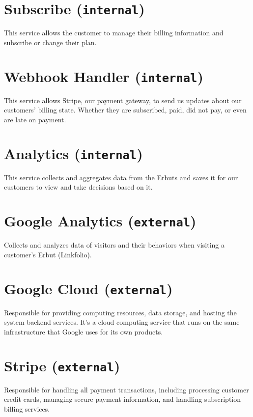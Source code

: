 \documentclass[a4paper]{report}
\begin{document}
\section{Subscribe (\texttt{internal})}

This service allows the customer to manage their billing information and subscribe or change their plan.

\section{Webhook Handler (\texttt{internal})}

This service allows Stripe, our payment gateway, to send us updates about our customers' billing state. Whether they are subscribed, paid, did not pay, or even are late on payment.

\section{Analytics (\texttt{internal})}

This service collects and aggregates data from the Erbuts and saves it for our customers to view and take decisions based on it.

\section{Google Analytics (\texttt{external})}

Collects and analyzes data of visitors and their behaviors when visiting a customer’s Erbut (Linkfolio).

\section{Google Cloud (\texttt{external})}

Responsible for providing computing resources, data storage, and hosting the system backend services. It’s a cloud computing service that runs on the same infrastructure that Google uses for its own products.

\section{Stripe (\texttt{external})}

Responsible for handling all payment transactions, including processing customer credit cards, managing secure payment information, and handling subscription billing services.
\end{document}
